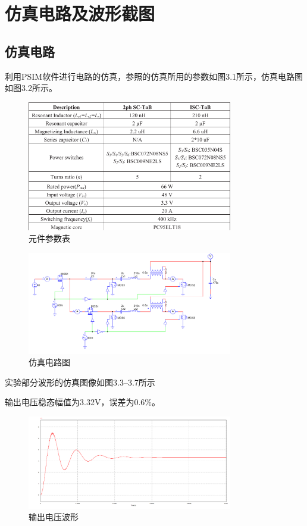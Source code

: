 \documentclass[12pt,a4paper]{report}
\begin{document}
\chapter{仿真电路及波形截图}
\section{仿真电路}
利用PSIM软件进行电路的仿真，参照的仿真所用的参数如图3.1所示，仿真电路图如图3.2所示。
\begin{figure}[h]
    \centering
    \includegraphics[width = 0.8\textwidth]{figures/parameter_table figure.png}
    \caption{元件参数表}
\end{figure}
\begin{figure}[h]
    \centering
    \includegraphics[width = 0.8\textwidth]{figures/PSIM-circuit diagram1.png}
    \caption{仿真电路图}
\end{figure}

实验部分波形的仿真图像如图3.3--3.7所示

输出电压稳态幅值为3.32V，误差为$0.6\%$。

\begin{figure}[h]
    \centering
    \includegraphics[width = 0.8\textwidth]{figures/sim_v_out.png}
    \caption{输出电压波形}
\end{figure}
\end{document}
